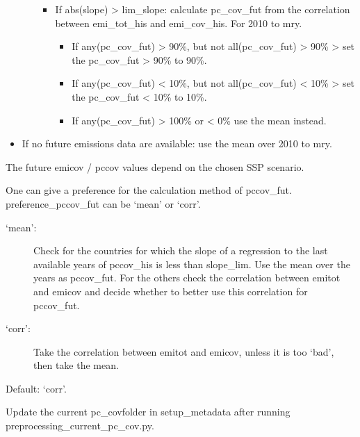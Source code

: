 \documentclass[letterpaper,10pt,english]{sphinxmanual}
\begin{document}
\begin{itemize}
\begin{itemize}
\begin{itemize}
\item {} 
If abs(slope) \textgreater{} lim\_slope: calculate pc\_cov\_fut from the correlation between emi\_tot\_his and emi\_cov\_his. For 2010 to mry.
\begin{itemize}
\item {} 
If any(pc\_cov\_fut) \textgreater{} 90\%, but not all(pc\_cov\_fut) \textgreater{} 90\% \textendash{}\textgreater{} set the pc\_cov\_fut \textgreater{} 90\% to 90\%.

\item {} 
If any(pc\_cov\_fut) \textless{} 10\%, but not all(pc\_cov\_fut) \textless{} 10\% \textendash{}\textgreater{} set the pc\_cov\_fut \textless{} 10\% to 10\%.

\item {} 
If any(pc\_cov\_fut) \textgreater{} 100\% or \textless{} 0\% use the mean instead.

\end{itemize}

\end{itemize}

\end{itemize}

\item {} 
If no future emissions data are available: use the mean over 2010 to mry.

\end{itemize}

The future emicov / pccov values depend on the chosen SSP scenario.

One can give a preference for the calculation method of pccov\_fut.
preference\_pccov\_fut can be ‘mean’ or ‘corr’.
\begin{description}
\item[{‘mean’:}] \leavevmode
Check for the countries for which the slope of a regression to the last available years of pccov\_his is less than slope\_lim.
Use the mean over the years as pccov\_fut.
For the others check the correlation between emitot and emicov and decide whether to better use this correlation for pccov\_fut.

\item[{‘corr’:}] \leavevmode
Take the correlation between emitot and emicov, unless it is too ‘bad’, then take the mean.

\end{description}

Default: ‘corr’.

Update the current pc\_cov\sphinxhyphen{}folder in setup\_metadata after running preprocessing\_current\_pc\_cov.py.
\end{document}
